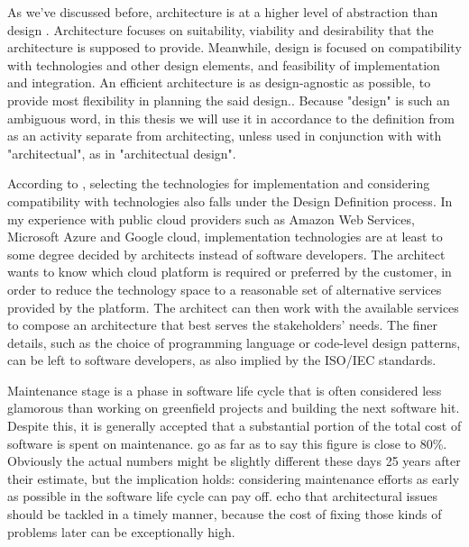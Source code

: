 \documentclass[utf8,english]{gradu3}
\begin{document}
As we've discussed before, architecture is at a higher level of abstraction than
design \parencite{IEEE12207}. Architecture focuses on suitability, viability and
desirability that the architecture is supposed to provide. Meanwhile, design is
focused on compatibility with technologies and other design elements, and
feasibility of implementation and integration. An efficient architecture is as
design-agnostic as possible, to provide most flexibility in planning the said
design.\parencite[71]{IEEE12207}. Because "design" is such an ambiguous word, in this
thesis we will use it in accordance to the definition from \textcite{IEEE12207} as an activity
separate from architecting, unless used in conjunction with with "architectual",
as in "architectual design".

According to \textcite[71-72]{IEEE12207}, selecting the technologies for implementation
and considering compatibility with technologies also falls under the Design
Definition process. In my experience with public cloud providers such as Amazon
Web Services, Microsoft Azure and Google cloud, implementation technologies are
at least to some degree decided by architects instead of software developers.
The architect wants to know which cloud platform is required or preferred by the
customer, in order to reduce the technology space to a reasonable set of
alternative services provided by the platform. The architect can then work with
the available services to compose an architecture that best serves the
stakeholders' needs. The finer details, such as the choice of programming
language or code-level design patterns, can be left to software developers, as
also implied by the ISO/IEC standards.

Maintenance stage is a phase in software life cycle that is often considered
less glamorous than working on greenfield projects and building the next
software hit. Despite this, it is generally accepted that a substantial portion
of the total cost of software is spent on maintenance. \textcite[32]{Bass1998} go as far
as to say this figure is close to 80\%. Obviously the actual numbers might be
slightly different these days 25 years after their estimate, but the implication
holds: considering maintenance efforts as early as possible in the software life
cycle can pay off. \textcite[1]{Mumtaz2021} echo that architectural issues should be
tackled in a timely manner, because the cost of fixing those kinds of problems
later can be exceptionally high.
\end{document}
